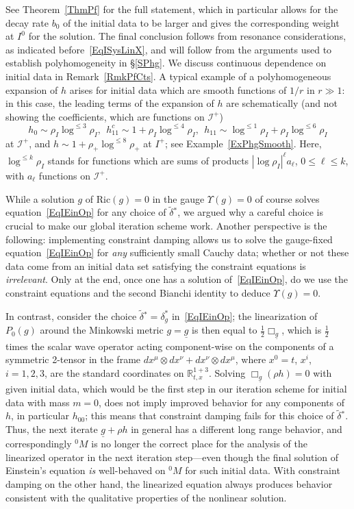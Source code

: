 \documentclass[reqno,11pt,letterpaper]{amsart}
\numberwithin{equation}{section}
\numberwithin{figure}{section}
\theoremstyle{definition}
\theoremstyle{remark}
\newcommand{\ms}{\mathscr}
\newcommand{\scri}{\ms I}
\newcommand{\R}{\mathbb{R}}
\newcommand{\Ups}{\Upsilon}
\newcommand{\ul}[1]{\underline{#1}{}}
\newcommand{\wt}{\widetilde}
\newcommand{\half}{\tfrac{1}{2}}
\newcommand{\tdel}{\wt{\delta}{}}
\newcommand{\Ric}{\mathrm{Ric}}
\begin{document}
See Theorem~\ref{ThmPf} for the full statement, which in particular allows for the decay rate $b_0$ of the initial data to be larger and gives the corresponding weight at $I^0$ for the solution. The final conclusion follows from resonance considerations, as indicated before~\eqref{EqISysLinX}, and will follow from the arguments used to establish polyhomogeneity in \S\ref{SPhg}. We discuss continuous dependence on initial data in Remark~\ref{RmkPfCts}. A typical example of a polyhomogeneous expansion of $h$ arises for initial data which are smooth functions of $1/r$ in $r\gg 1$: in this case, the leading terms of the expansion of $h$ are schematically (and not showing the coefficients, which are functions on $\scri^+$)
\begin{equation}
\label{EqIDetailLogPowers}
  h_0\sim\rho_I\log^{\leq 3}\rho_I,\ \ 
  h_{1 1}^c\sim 1+\rho_I\log^{\leq 4}\rho_I,\ \ 
  h_{1 1}\sim\log^{\leq 1}\rho_I+\rho_I\log^{\leq 6}\rho_I
\end{equation}
at $\scri^+$, and $h\sim 1+\rho_+\log^{\leq 8}\rho_+$ at $I^+$; see Example~\ref{ExPhgSmooth}. Here, $\log^{\leq k}\rho_I$ stands for functions which are sums of products $|\log\rho_I|^\ell a_\ell$, $0\leq\ell\leq k$, with $a_\ell$ functions on $\scri^+$.

While a solution $g$ of $\Ric(g)=0$ in the gauge $\Ups(g)=0$ of course solves equation~\eqref{EqIEinOp} for any choice of $\tdel^*$, we argued why a careful choice is crucial to make our global iteration scheme work. Another perspective is the following: implementing constraint damping allows us to solve the gauge-fixed equation~\eqref{EqIEinOp} for \emph{any} sufficiently small Cauchy data; whether or not these data come from an initial data set satisfying the constraint equations is \emph{irrelevant}. Only at the end, once one has a solution of~\eqref{EqIEinOp}, do we use the constraint equations and the second Bianchi identity to deduce $\Ups(g)=0$.

In contrast, consider the choice $\tdel^*=\delta_g^*$ in~\eqref{EqIEinOp}; the linearization of $P_0(g)$ around the Minkowski metric $g=\ul g$ is then equal to $\half\Box_{\ul g}$, which is $\half$ times the scalar wave operator acting component-wise on the components of a symmetric 2-tensor in the frame $d x^\mu\otimes d x^\nu+d x^\nu\otimes d x^\mu$, where $x^0=t$, $x^i$, $i=1,2,3$, are the standard coordinates on $\R^{1+3}_{t,x}$. Solving $\Box_{\ul g}(\rho h)=0$ with given initial data, which would be the first step in our iteration scheme for initial data with mass $m=0$, does not imply improved behavior for any components of $h$, in particular $h_{0 0}$; this means that constraint damping fails for this choice of $\tdel^*$. Thus, the next iterate $\ul g+\rho h$ in general has a different long range behavior, and correspondingly ${}^0\!M$ is no longer the correct place for the analysis of the linearized operator in the next iteration step---even though the final solution of Einstein's equation \emph{is} well-behaved on ${}^0\!M$ for such initial data. With constraint damping on the other hand, the linearized equation always produces behavior consistent with the qualitative properties of the nonlinear solution.
\end{document}
